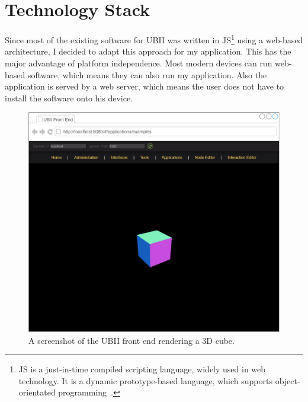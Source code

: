 \section{Technology Stack}\label{section:technology-stack}

Since most of the existing software for \ac{UBII} was written in \acf{JS}\footnote{\ac{JS} is a just-in-time compiled scripting language, widely used in web technology. It is a dynamic prototype-based language, which supports object-orientated programming~\cite[43, 47]{ECMAInternational.2018}.} using a web-based architecture, I decided to adapt this approach for my application. This has the major advantage of platform independence. Most modern devices can run web-based software, which means they can also run my application. Also the application is served by a web server, which means the user does not have to install the software onto his device.

\begin{figure}[htpb]
  \centering
  \includegraphics[width=12cm]{figures/ubii_front_end.pdf}
  \caption[Screenshot of the UBII front end]{A screenshot of the UBII front end rendering a 3D cube.}\label{fig:ubii-front-end}
\end{figure}

